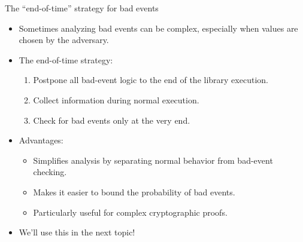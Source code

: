 \documentclass[aspectratio=169, lualatex, handout]{beamer}
\begin{document}
\begin{frame}{The ``end-of-time'' strategy for bad events}
	\begin{itemize}[<+->]
		\item Sometimes analyzing bad events can be complex, especially when values are chosen by the adversary.
		\item The end-of-time strategy:
		      \begin{enumerate}[<+->]
			      \item Postpone all bad-event logic to the end of the library execution.
			      \item Collect information during normal execution.
			      \item Check for bad events only at the very end.
		      \end{enumerate}
		\item Advantages:
		      \begin{itemize}[<+->]
			      \item Simplifies analysis by separating normal behavior from bad-event checking.
			      \item Makes it easier to bound the probability of bad events.
			      \item Particularly useful for complex cryptographic proofs.
		      \end{itemize}
		\item We'll use this in the next topic!
	\end{itemize}
\end{frame}

\begin{frame}[plain]
	\titlepage
\end{frame}
\end{document}
